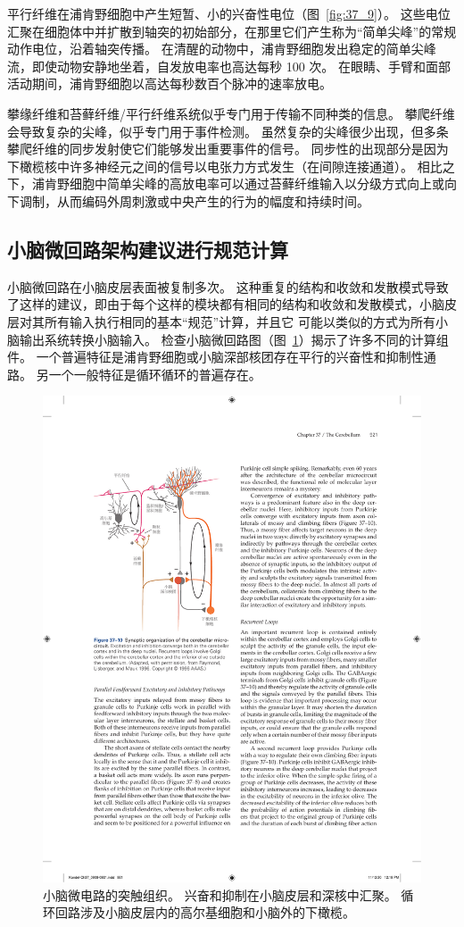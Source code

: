 平行纤维在浦肯野细胞中产生短暂、小的兴奋性电位（图~\ref{fig:37_9}）。
这些电位汇聚在细胞体中并扩散到轴突的初始部分，在那里它们产生称为“简单尖峰”的常规动作电位，沿着轴突传播。
在清醒的动物中，浦肯野细胞发出稳定的简单尖峰流，即使动物安静地坐着，自发放电率也高达每秒 100 次。
在眼睛、手臂和面部活动期间，浦肯野细胞以高达每秒数百个脉冲的速率放电。


攀缘纤维和苔藓纤维/平行纤维系统似乎专门用于传输不同种类的信息。
攀爬纤维会导致复杂的尖峰，似乎专门用于事件检测。
虽然复杂的尖峰很少出现，但多条攀爬纤维的同步发射使它们能够发出重要事件的信号。
同步性的出现部分是因为下橄榄核中许多神经元之间的信号以电张力方式发生（在间隙连接通道）。
相比之下，浦肯野细胞中简单尖峰的高放电率可以通过苔藓纤维输入以分级方式向上或向下调制，从而编码外周刺激或中央产生的行为的幅度和持续时间。



\subsection{小脑微回路架构建议进行规范计算}

小脑微回路在小脑皮层表面被复制多次。
这种重复的结构和收敛和发散模式导致了这样的建议，即由于每个这样的模块都有相同的结构和收敛和发散模式，小脑皮层对其所有输入执行相同的基本“规范”计算，并且它 可能以类似的方式为所有小脑输出系统转换小脑输入。
检查小脑微回路图（图~\ref{fig:37_10}）揭示了许多不同的计算组件。
一个普遍特征是浦肯野细胞或小脑深部核团存在平行的兴奋性和抑制性通路。
另一个一般特征是循环循环的普遍存在。


\begin{figure}[htbp]
	\centering
	\includegraphics[width=0.6\linewidth]{chap37/fig_37_10}
	\caption{小脑微电路的突触组织。
		兴奋和抑制在小脑皮层和深核中汇聚。
		循环回路涉及小脑皮层内的高尔基细胞和小脑外的下橄榄\cite{raymond1996cerebellum}。}
	\label{fig:37_10}
\end{figure}


